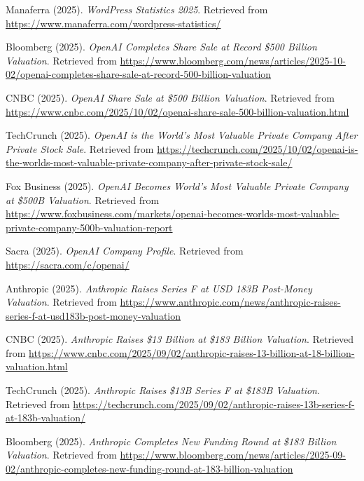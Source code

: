 \documentclass[10pt,a4paper]{article}
\begin{document}
\begin{thebibliography}{99}
Manaferra (2025).
\textit{WordPress Statistics 2025}.
Retrieved from \url{https://www.manaferra.com/wordpress-statistics/}


Bloomberg (2025).
\textit{OpenAI Completes Share Sale at Record \$500 Billion Valuation}.
Retrieved from \url{https://www.bloomberg.com/news/articles/2025-10-02/openai-completes-share-sale-at-record-500-billion-valuation}

CNBC (2025).
\textit{OpenAI Share Sale at \$500 Billion Valuation}.
Retrieved from \url{https://www.cnbc.com/2025/10/02/openai-share-sale-500-billion-valuation.html}

TechCrunch (2025).
\textit{OpenAI is the World's Most Valuable Private Company After Private Stock Sale}.
Retrieved from \url{https://techcrunch.com/2025/10/02/openai-is-the-worlds-most-valuable-private-company-after-private-stock-sale/}

Fox Business (2025).
\textit{OpenAI Becomes World's Most Valuable Private Company at \$500B Valuation}.
Retrieved from \url{https://www.foxbusiness.com/markets/openai-becomes-worlds-most-valuable-private-company-500b-valuation-report}

Sacra (2025).
\textit{OpenAI Company Profile}.
Retrieved from \url{https://sacra.com/c/openai/}

Anthropic (2025).
\textit{Anthropic Raises Series F at USD 183B Post-Money Valuation}.
Retrieved from \url{https://www.anthropic.com/news/anthropic-raises-series-f-at-usd183b-post-money-valuation}

CNBC (2025).
\textit{Anthropic Raises \$13 Billion at \$183 Billion Valuation}.
Retrieved from \url{https://www.cnbc.com/2025/09/02/anthropic-raises-13-billion-at-18-billion-valuation.html}

TechCrunch (2025).
\textit{Anthropic Raises \$13B Series F at \$183B Valuation}.
Retrieved from \url{https://techcrunch.com/2025/09/02/anthropic-raises-13b-series-f-at-183b-valuation/}

Bloomberg (2025).
\textit{Anthropic Completes New Funding Round at \$183 Billion Valuation}.
Retrieved from \url{https://www.bloomberg.com/news/articles/2025-09-02/anthropic-completes-new-funding-round-at-183-billion-valuation}


\end{thebibliography}
\end{document}
